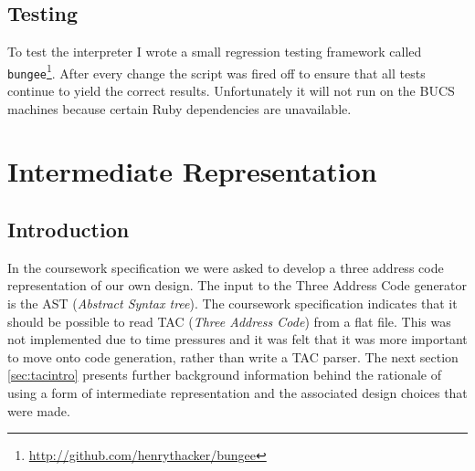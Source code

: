 \subsection{Testing}
To test the interpreter I wrote a small regression testing framework called \verb!bungee!\footnote{\url{http://github.com/henrythacker/bungee}}. After every change the script was fired off to ensure that all tests continue to yield the correct results. Unfortunately it will not run on the BUCS machines because certain Ruby dependencies are unavailable.

\newpage
\section{Intermediate Representation}

\subsection{Introduction}
\label{sec:tacshortintro}
In the coursework specification we were asked to develop a three address code representation of our own design. The input to the Three Address Code generator is the AST (\emph{Abstract Syntax tree}). The coursework specification indicates that it should be possible to read TAC (\emph{Three Address Code}) from a flat file. This was not implemented due to time pressures and it was felt that it was more important to move onto code generation, rather than write a TAC parser. The next section \ref{sec:tacintro} presents further background information behind the rationale of using a form of intermediate representation and the associated design choices that were made.

